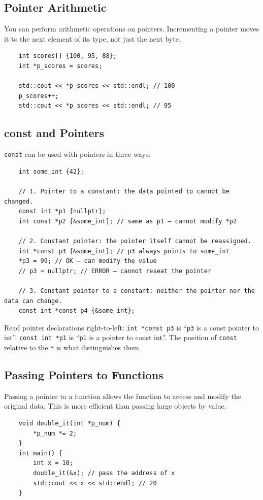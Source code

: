 \subsection{Pointer Arithmetic}
You can perform arithmetic operations on pointers. Incrementing a pointer moves it to the next element of its type, not just the next byte.
\begin{lstlisting}
	int scores[] {100, 95, 88};
	int *p_scores = scores;

	std::cout << *p_scores << std::endl; // 100
	p_scores++;
	std::cout << *p_scores << std::endl; // 95
\end{lstlisting}

\subsection{const and Pointers}
\texttt{const} can be used with pointers in three ways:
\begin{lstlisting}
	int some_int {42};

	// 1. Pointer to a constant: the data pointed to cannot be changed.
	const int *p1 {nullptr};
	int const *p2 {&some_int}; // same as p1 — cannot modify *p2

	// 2. Constant pointer: the pointer itself cannot be reassigned.
	int *const p3 {&some_int}; // p3 always points to some_int
	*p3 = 99; // OK — can modify the value
	// p3 = nullptr; // ERROR — cannot reseat the pointer

	// 3. Constant pointer to a constant: neither the pointer nor the data can change.
	const int *const p4 {&some_int};
\end{lstlisting}

\begin{remark}
	Read pointer declarations right-to-left: \texttt{int *const p3} is ``\texttt{p3} is a const pointer to int''. \texttt{const int *p1} is ``\texttt{p1} is a pointer to const int''. The position of \texttt{const} relative to the \texttt{*} is what distinguishes them.
\end{remark}

\subsection{Passing Pointers to Functions}
Passing a pointer to a function allows the function to access and modify the original data. This is more efficient than passing large objects by value.
\begin{lstlisting}
	void double_it(int *p_num) {
		*p_num *= 2;
	}
	int main() {
		int x = 10;
		double_it(&x); // pass the address of x
		std::cout << x << std::endl; // 20
	}
\end{lstlisting}

